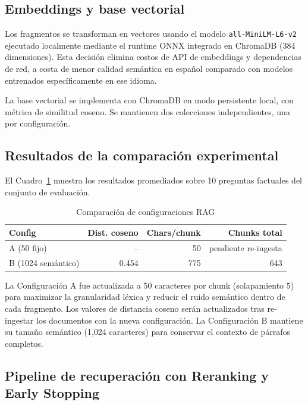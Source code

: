 \documentclass[conference]{IEEEtran}
\begin{document}
\subsection{Embeddings y base vectorial}

Los fragmentos se transforman en vectores usando el modelo \texttt{all-MiniLM-L6-v2} ejecutado localmente mediante el runtime ONNX integrado en ChromaDB (384 dimensiones). Esta decisión elimina costos de API de embeddings y dependencias de red, a costa de menor calidad semántica en español comparado con modelos entrenados específicamente en ese idioma.

La base vectorial se implementa con ChromaDB en modo persistente local, con métrica de similitud coseno. Se mantienen dos colecciones independientes, una por configuración.

\subsection{Resultados de la comparación experimental}

El Cuadro~\ref{tab:rag_comparison} muestra los resultados promediados sobre 10 preguntas factuales del conjunto de evaluación.

\begin{table}[htbp]
\caption{Comparación de configuraciones RAG}
\label{tab:rag_comparison}
\begin{tabular}{@{}lrrr@{}}
\toprule
\textbf{Config} & \textbf{Dist. coseno} & \textbf{Chars/chunk} & \textbf{Chunks total} \\
\midrule
A (50 fijo) & -- & 50 & pendiente re-ingesta \\
B (1024 semántico) & 0.454 & 775 & 643 \\
\bottomrule
\end{tabular}
\end{table}

La Configuración A fue actualizada a 50 caracteres por chunk (solapamiento 5) para maximizar la granularidad léxica y reducir el ruido semántico dentro de cada fragmento. Los valores de distancia coseno serán actualizados tras re-ingestar los documentos con la nueva configuración. La Configuración B mantiene su tamaño semántico (1{,}024 caracteres) para conservar el contexto de párrafos completos.

\subsection{Pipeline de recuperación con Reranking y Early Stopping}
\end{document}
